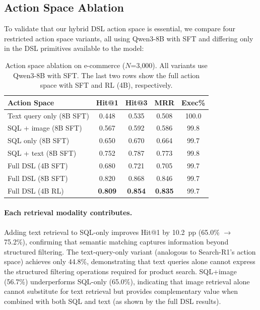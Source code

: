 \subsection{Action Space Ablation}
\label{sec:action_space}

To validate that our hybrid DSL action space is essential, we compare four restricted action space variants, all using Qwen3-8B with SFT and differing only in the DSL primitives available to the model:

\begin{table}[t]
\centering
\small
\caption{Action space ablation on e-commerce ($N$=3{,}000). All variants use Qwen3-8B with SFT. The last two rows show the full action space with SFT and RL (4B), respectively.}
\label{tab:action_space}
\begin{tabular}{lcccc}
\toprule
\textbf{Action Space} & \textbf{Hit@1} & \textbf{Hit@3} & \textbf{MRR} & \textbf{Exec\%} \\
\midrule
Text query only (8B SFT) & 0.448 & 0.535 & 0.508 & 100.0 \\
SQL + image (8B SFT) & 0.567 & 0.592 & 0.586 & 99.8 \\
SQL only (8B SFT) & 0.650 & 0.670 & 0.664 & 99.7 \\
SQL + text (8B SFT) & 0.752 & 0.787 & 0.773 & 99.8 \\
\midrule
Full DSL (4B SFT) & 0.680 & 0.721 & 0.705 & 99.7 \\
Full DSL (8B SFT) & 0.820 & 0.868 & 0.846 & 99.7 \\
Full DSL (4B RL) & \textbf{0.809} & \textbf{0.854} & \textbf{0.835} & 99.7 \\
\bottomrule
\end{tabular}
\end{table}

\paragraph{Each retrieval modality contributes.}
Adding text retrieval to SQL-only improves Hit@1 by 10.2~pp (65.0\% $\to$ 75.2\%), confirming that semantic matching captures information beyond structured filtering.
The text-query-only variant (analogous to Search-R1's action space) achieves only 44.8\%, demonstrating that text queries alone cannot express the structured filtering operations required for product search.
SQL+image (56.7\%) underperforms SQL-only (65.0\%), indicating that image retrieval alone cannot substitute for text retrieval but provides complementary value when combined with both SQL and text (as shown by the full DSL results).

